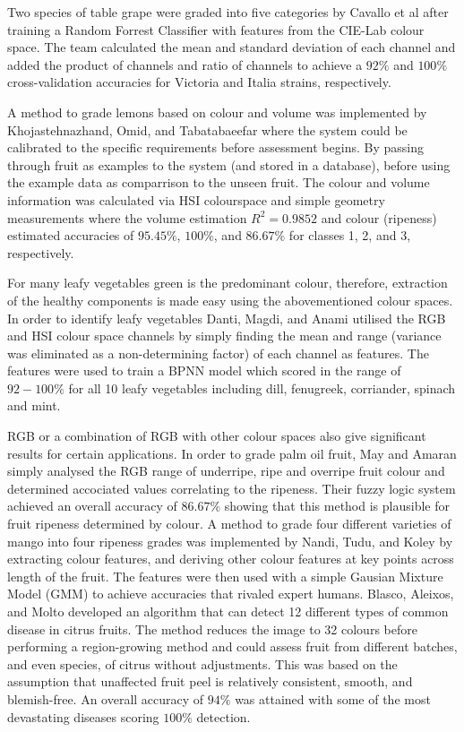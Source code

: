 \documentclass[fleqn,twoside]{article}
\begin{document}
Two species of table grape were graded into five categories by Cavallo et al \cite{cavallo} after training a Random Forrest Classifier with features from the CIE-Lab colour space. The team calculated the mean and standard deviation of each channel and added the product of channels and ratio of channels to achieve a $92\%$ and $100\%$ cross-validation accuracies for Victoria and Italia strains, respectively.

A method to grade lemons based on colour and volume was implemented by Khojastehnazhand, Omid, and Tabatabaeefar \cite{khojastehnazhand} where the system could be calibrated to the specific requirements before assessment begins. By passing through fruit as examples to the system (and stored in a database), before using the example data as comparrison to the unseen fruit. The colour and volume information was calculated via HSI colourspace and simple geometry measurements where the volume estimation $R^2 = 0.9852$ and colour (ripeness) estimated accuracies of $95.45\%$, $100\%$, and $86.67\%$ for classes 1, 2, and 3, respectively.

For many leafy vegetables green is the predominant colour, therefore, extraction of the healthy components is made easy using the abovementioned colour spaces. In order to identify leafy vegetables Danti, Magdi, and Anami \cite{danti} utilised the RGB and HSI colour space channels by simply finding the mean and range (variance was eliminated as a non-determining factor) of each channel as features. The features were used to train a BPNN model which scored in the range of $92-100\%$ for all 10 leafy vegetables including dill, fenugreek, corriander, spinach and mint. 

RGB or a combination of RGB with other colour spaces also give significant results for certain applications. In order to grade palm oil fruit, May and Amaran \cite{may} simply analysed the RGB range of underripe, ripe and overripe fruit colour and determined accociated values correlating to the ripeness. Their fuzzy logic system achieved an overall accuracy of $86.67\%$ showing that this method is plausible for fruit ripeness determined by colour. A method to grade four different varieties of mango into four ripeness grades was implemented by Nandi, Tudu, and Koley \cite{nandi} by extracting colour features, and deriving other colour features at key points across length of the fruit. The features were then used with a simple Gausian Mixture Model (GMM) to achieve accuracies that rivaled expert humans. Blasco, Aleixos, and Molto \cite{blasco2} developed an algorithm that can detect 12 different types of common disease in citrus fruits. The method reduces the image to 32 colours before performing a region-growing method and could assess fruit from different batches, and even species, of citrus without adjustments. This was based on the assumption that unaffected fruit peel is relatively consistent, smooth, and blemish-free. An overall accuracy of $94\%$ was attained with some of the most devastating diseases scoring $100\%$ detection. 
\end{document}
